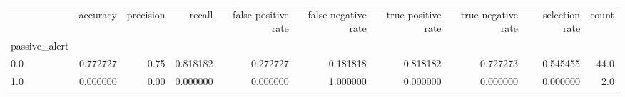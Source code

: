 \begin{tabular}{lrrrrrrrrr}
\toprule
{} &  accuracy &  precision &    recall &  false positive rate &  false negative rate &  true positive rate &  true negative rate &  selection rate &  count \\
passive\_alert &           &            &           &                      &                      &                     &                     &                 &        \\
\midrule
0.0           &  0.772727 &       0.75 &  0.818182 &             0.272727 &             0.181818 &            0.818182 &            0.727273 &        0.545455 &   44.0 \\
1.0           &  0.000000 &       0.00 &  0.000000 &             0.000000 &             1.000000 &            0.000000 &            0.000000 &        0.000000 &    2.0 \\
\bottomrule
\end{tabular}
